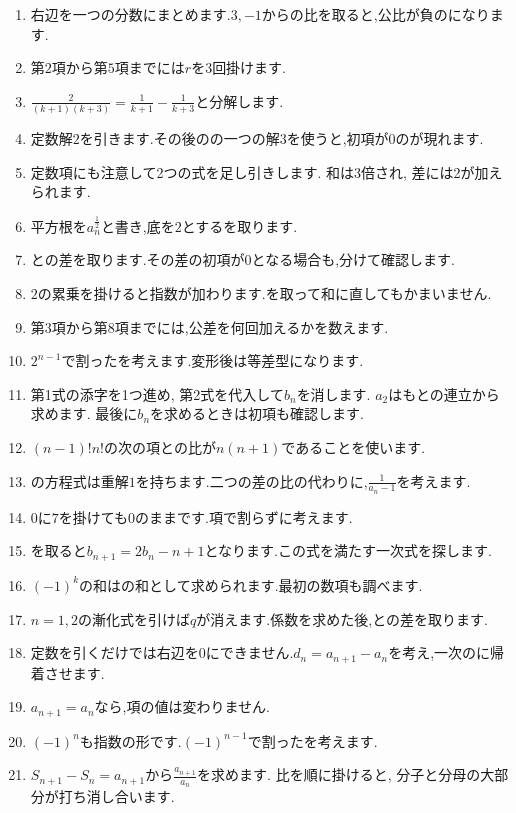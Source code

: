 \begin{enumerate}[label=\textbf{問\arabic*.},leftmargin=3.8em,format=\bookitemlink{practice-basic}{hint}{answer}]
  \item 右辺を一つの分数にまとめます.$3,-1$からの比を取ると,公比が負のになります.
  \item 第$2$項から第$5$項までには$r$を$3$回掛けます.
  \item $\frac{2}{(k+1)(k+3)}=\frac1{k+1}-\frac1{k+3}$と分解します.
  \item 定数解$2$を引きます.その後のの一つの解$3$を使うと,初項が$0$のが現れます.
  \item 定数項にも注意して2つの式を足し引きします. 和は3倍され, 差には2が加えられます.
  \item 平方根を$a_n^{\frac{1}{2}}$と書き,底を$2$とするを取ります.
  \item {}との差を取ります.その差の初項が$0$となる場合も,分けて確認します.
  \item $2$の累乗を掛けると指数が加わります.を取って和に直してもかまいません.
  \item 第$3$項から第$8$項までには,公差を何回加えるかを数えます.
  \item $2^{n-1}$で割ったを考えます.変形後は等差型になります.
  \item 第1式の添字を1つ進め, 第2式を代入して$b_n$を消します. $a_2$はもとの連立から求めます. 最後に$b_n$を求めるときは初項も確認します.
  \item $(n-1)!n!$の次の項との比が$n(n+1)$であることを使います.
  \item {}の方程式は重解$1$を持ちます.二つの差の比の代わりに,$\frac{1}{a_n-1}$を考えます.
  \item $0$に$7$を掛けても$0$のままです.項で割らずに考えます.
  \item {}を取ると$b_{n+1}=2b_n-n+1$となります.この式を満たす一次式を探します.
  \item $(-1)^k$の和はの和として求められます.最初の数項も調べます.
  \item $n=1,2$の漸化式を引けば$q$が消えます.係数を求めた後,との差を取ります.
  \item 定数を引くだけでは右辺を$0$にできません.$d_n=a_{n+1}-a_n$を考え,一次のに帰着させます.
  \item $a_{n+1}=a_n$なら,項の値は変わりません.
  \item $(-1)^n$も指数の形です.$(-1)^{n-1}$で割ったを考えます.
  \item $S_{n+1}-S_n=a_{n+1}$から$\frac{a_{n+1}}{a_n}$を求めます. 比を順に掛けると, 分子と分母の大部分が打ち消し合います.
\end{enumerate}

